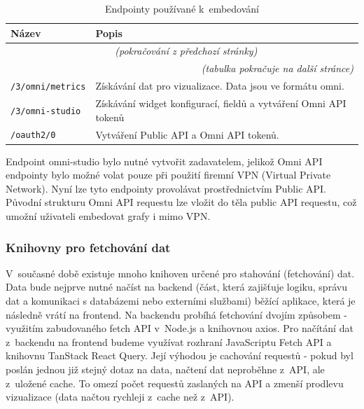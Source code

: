 \documentclass[czech, bc, kiv, he, iso690numb]{fasthesis}
\begin{document}
	\begin{longtable}{p{}p{}}
	\caption{Endpointy používané k~embedování}
	\label{tab:embeddingEndpoints}\\
	\toprule[1.5pt]
	\textbf{Název} & \textbf{Popis}\\
	\midrule
	\endfirsthead
	\multicolumn{2}{c}{\tablename{}~\thetable{} \textit{(pokračování z předchozí stránky)}}\\
	\endhead
	\midrule
	\multicolumn{2}{r}{\textit{(tabulka pokračuje na další stránce)}}\\
	\endfoot
	\bottomrule[1.5pt]
	\endlastfoot
	\verb"/3/omni/metrics" & Získávání dat pro vizualizace. Data jsou ve formátu omni. \\
	\midrule
	\verb"/3/omni-studio" &  Získávání widget konfigurací, fieldů a vytváření Omni API tokenů\\
	\midrule
	\verb"/oauth2/0" &  Vytváření Public API a Omni API tokenů. \\
	\end{longtable}

Endpoint omni-studio bylo nutné vytvořit zadavatelem, jelikož Omni API endpointy bylo možné volat pouze při použití firemní VPN (Virtual Private Network). Nyní lze tyto endpointy provolávat prostřednictvím Public API. Původní
strukturu Omni API requestu lze vložit do těla public API requestu, což umožní uživateli embedovat grafy i mimo VPN.

\subsubsection{Knihovny pro fetchování dat}

V~současné době existuje mnoho knihoven určené pro stahování (fetchování) dat. Data bude nejprve nutné načíst na backend (část, která zajišťuje logiku, správu dat a komunikaci s databázemi nebo externími službami) běžící aplikace, která je následně vrátí na frontend. Na backendu probíhá fetchování dvojím způsobem - 
využitím zabudovaného fetch API v~Node.js a knihovnou axios. Pro načítání dat z~backendu na frontend budeme využívat rozhraní JavaScriptu Fetch API a knihovnu TanStack React Query. Její výhodou je cachování
requestů \cite{tanstackQueryDocs} - pokud byl poslán jednou již stejný dotaz na data, načtení dat neproběhne z~API, ale z~uložené cache. To omezí počet requestů zaslaných na API a zmenší prodlevu vizualizace (data načtou rychleji z~cache než z~API). 
\end{document}
